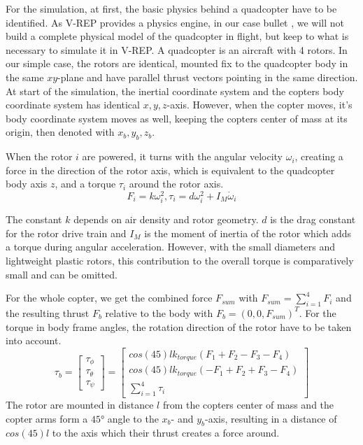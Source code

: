     
    For the simulation, at first, the basic physics behind a quadcopter have to be identified. 
    As V-REP provides a physics engine, in our case bullet \cite{bullet}, we will not build a complete physical model of the quadcopter in flight, but keep to what is necessary to simulate it in V-REP.
    A quadcopter is an aircraft with 4 rotors. 
    In our simple case, the rotors are identical, mounted fix to the quadcopter body in the same $xy$-plane and have parallel thrust vectors pointing in the same direction. 
    At start of the simulation, the inertial coordinate system and the copters body coordinate system has identical $x,y,z$-axis. 
    However, when the copter moves, it's body coordinate system moves as well, keeping the copters center of mass at its origin, then denoted with $x_b, y_b, z_b$.
    
    When the rotor $i$ are powered, it turns with the angular velocity $\omega_i$, creating a force in the direction of the rotor axis, which is equivalent to the quadcopter body axis $z$, and a torque $\tau_i$ around the rotor axis.
    \begin{equation}
    F_i = k\omega_i^2, \tau_i = d\omega_i^2 + I_M\dot\omega_i
    \label{equ:forceAndTorque}
    \end{equation}
    
    The constant $k$ depends on air density and rotor geometry. $d$ is the drag constant for the rotor drive train and $I_M$ is the moment of inertia of the rotor which adds a torque during angular acceleration. However, with the small diameters and lightweight plastic rotors, this contribution to the overall torque is comparatively small and can be omitted.
    
    For the whole copter, we get the combined force $F_{sum}$ with $F_{sum} = \sum_{i=1}^{4}{F_i}$ and the resulting thrust $F_b$ relative to the body with $F_b = (0, 0, F_{sum})^T$. For the torque in body frame angles, the rotation direction of the rotor have to be taken into account.
    \begin{equation}
    \tau_b =\begin{bmatrix}\tau_\phi \\ \tau_\theta \\ \tau_\psi \end{bmatrix} = \begin{bmatrix}cos(45)lk_{torque}(F_1 + F_2 - F_3 - F_4) \\ cos(45)lk_{torque}(-F_1 + F_2 + F_3  - F_4  ) \\ \sum_{i=1}^{4}{\tau_i} \end{bmatrix}
    \label{equ:torques}
    \end{equation}
    The rotor are mounted in distance $l$ from the copters center of mass and the copter arms form a $\ang{45}$ angle to the $x_b$- and $y_b$-axis, resulting in a distance of $cos(45)l$ to the axis which their thrust creates a force around\cite{luukkonen2011modelling}.
    
